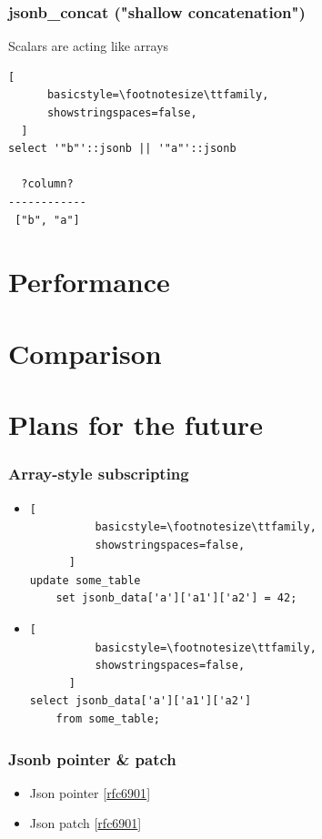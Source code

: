 \documentclass[14pt, compress]{beamer}
\begin{document}
\begin{frame}[fragile]
\frametitle{jsonb\_concat ("shallow concatenation")}
    Scalars are acting like arrays
  \begin{lstlisting}[
      basicstyle=\footnotesize\ttfamily,
      showstringspaces=false,
  ]
select '"b"'::jsonb || '"a"'::jsonb

  ?column?  
------------
 ["b", "a"]

  \end{lstlisting}
\end{frame}

\section{Performance}

\section{Comparison}

\section{Plans for the future}

\begin{frame}[fragile]
  \frametitle{Array-style subscripting}

  \begin{itemize}
      \item
      \begin{lstlisting}[
          basicstyle=\footnotesize\ttfamily,
          showstringspaces=false,
      ]
update some_table
    set jsonb_data['a']['a1']['a2'] = 42;

      \end{lstlisting}

      \item
      \begin{lstlisting}[
          basicstyle=\footnotesize\ttfamily,
          showstringspaces=false,
      ]
select jsonb_data['a']['a1']['a2']
    from some_table;

      \end{lstlisting}
  \end{itemize}

\end{frame}

\begin{frame}[fragile]
  \frametitle{Jsonb pointer \& patch}

  \begin{itemize}
      \item[\MVRightarrow] Json pointer [\href{http://tools.ietf.org/html/rfc6901}{rfc6901}]
      \item[\MVRightarrow] Json patch [\href{http://tools.ietf.org/html/rfc6902}{rfc6901}]
  \end{itemize}

\end{frame}
\end{document}
